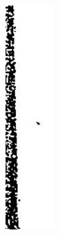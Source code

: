 \documentclass[10pt]{article}
\begin{document}
\includegraphics[max width=\textwidth, center]{2025_02_27_dd68c3d38de88f0516d9g-159}\\
\end{document}
